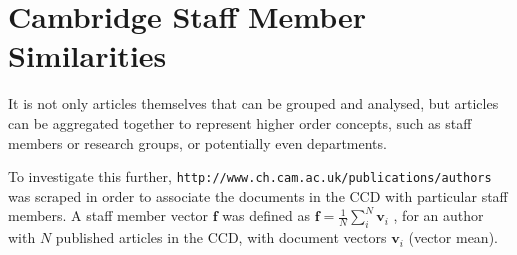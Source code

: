 \section{Cambridge Staff Member Similarities}
\label{sec:AUTHORCLUSTERS}

It is not only articles themselves that can be grouped and analysed, but articles can be aggregated together to represent higher order concepts, such as staff members or research groups, or potentially even departments. 

To investigate this further, \texttt{http://www.ch.cam.ac.uk/publications/authors} was scraped in order to associate the documents in the CCD with particular staff members. A staff member vector $\textbf{f}$ was defined as $\mathbf{f}=\frac{1}{N}\sum_{i}^{N} \mathbf{v}_i$ , for an author with $N$ published articles in the CCD, with document vectors $\mathbf{v}_i$ (vector mean).

